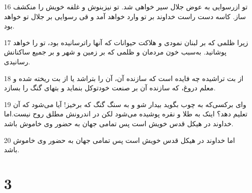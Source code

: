 \par 16 تو ازرسوایی به عوض جلال سیر خواهی شد. تو نیزبنوش و غلفه خویش را منکشف ساز. کاسه دست راست خداوند بر تو وارد خواهد آمد و قی رسوایی بر جلال تو خواهد بود.
\par 17 زیرا ظلمی که بر لبنان نمودی و هلاکت حیوانات که آنها راترسانیده بود، تو را خواهد پوشانید. به‌سبب خون مردمان و ظلمی که بر زمین و شهر و بر جمیع ساکنانش رسانیدی.
\par 18 از بت تراشیده چه فایده است که سازنده آن، آن را بتراشد یا از بت ریخته شده و معلم دروغ، که سازنده آن بر صنعت خودتوکل بنماید و بتهای گنگ را بسازد.
\par 19 وای برکسی‌که به چوب بگوید بیدار شو و به سنگ گنگ که برخیز! آیا می‌شود که آن تعلیم دهد؟ اینک به طلا و نقره پوشیده می‌شود لکن در اندرونش مطلق روح نیست.اما خداوند در هیکل قدس خویش است پس تمامی جهان به حضور وی خاموش باشد.
\par 20 اما خداوند در هیکل قدس خویش است پس تمامی جهان به حضور وی خاموش باشد.

\chapter{3}

